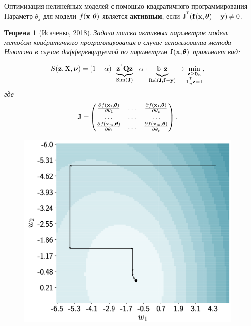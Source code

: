 \documentclass[10pt]{beamer}
\newtheorem{rustheorem}{Теорема}
\begin{document}
\begin{frame}{Оптимизация нелинейных моделей с помощью квадратичного программирования}
	Параметр $\theta_j$ для модели $f(\mathbf{x}, \boldsymbol{\theta})$ является \textbf{активным}, если $\mathbf{J}^{^{\text{\tiny\sffamily\upshape\mdseries T}}} (\mathbf{f}(\mathbf{x}, \boldsymbol{\theta}) - \mathbf{y}) \neq 0$.
	\begin{rustheorem}[Исаченко, 2018]
		Задача поиска активных параметров модели методом квадратичного программирования в случае использовании метода Ньютона в случае дифференцируемой по параметрам  $\mathbf{f}(\mathbf{x}, \boldsymbol{\theta})$ принимает вид:
		
		\begin{minipage}{0.55\linewidth}
				\[
				S(\mathbf{z}, \mathbf{X}, \boldsymbol{\nu}) = (1 - \alpha) \cdot \underbrace{\mathbf{z}^{^{\text{\tiny\sffamily\upshape\mdseries T}}} \mathbf{Q} \mathbf{z}}_{\textnormal{Sim}(\mathbf{J})} - \alpha \cdot \underbrace{\vphantom{()} \mathbf{b}^{^{\text{\tiny\sffamily\upshape\mdseries T}}} \mathbf{z}}_{\textnormal{Rel}(\mathbf{J},  \mathbf{f} - \mathbf{y})} \rightarrow \min_{\substack{\mathbf{z} \geq \boldsymbol{0}_n \\ \boldsymbol{1}_n^{^{\text{\tiny\sffamily\upshape\mdseries T}}} \mathbf{z}=1}},
				\]
			где
			\begin{equation*}
				 \mathbf{J} = 
				\begin{pmatrix}
					\frac{\partial f(\mathbf{x}_1 , \boldsymbol{\theta})}{\partial \theta_1} & \dots & 
					\frac{\partial f(\mathbf{x}_1 , \boldsymbol{\theta})}{\partial \theta_p} \\
					\dots & \dots & \dots \\
					\frac{\partial f(\mathbf{x}_m , \boldsymbol{\theta})}{\partial \theta_1} & \dots & 
					\frac{\partial f(\mathbf{x}_m , \boldsymbol{\theta})}{\partial \theta_p}
				\end{pmatrix}.
			\end{equation*}
		\end{minipage}%
		\begin{minipage}{0.45\linewidth}
			\begin{figure}
				\includegraphics[width=0.9\linewidth]{figs/newton_qpfs}
			\end{figure}
		\end{minipage}
	\end{rustheorem}
\end{frame}
\end{document}
